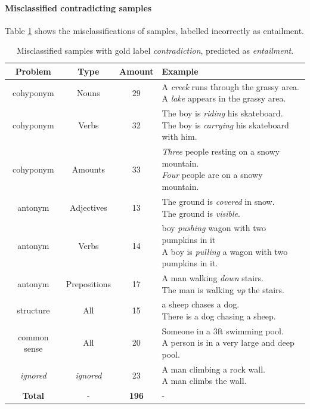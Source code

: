 \paragraph*{Misclassified contradicting samples}
Table \ref{tab:misclassified_orig_contr} shows the misclassifications of samples, labelled incorrectly as entailment.
\begin{table}[tph!]
\centering
\begin{tabular}{cccl}
\textbf{Problem} & \textbf{Type} & \textbf{Amount} & \textbf{Example} \\
\toprule
cohyponym & Nouns & 29 & \specialcell{A \textit{creek} runs through the grassy area.\\A \textit{lake} appears in the grassy area.}\\
cohyponym & Verbs & 32 & \specialcell{The boy is \textit{riding} his skateboard.\\The boy is \textit{carrying} his skateboard with him.}\\
cohyponym & Amounts & 33 & \specialcell{\textit{Three} people resting on a snowy mountain.\\\textit{Four} people are on a snowy mountain.}\\
antonym & Adjectives & 13 & \specialcell{The ground is \textit{covered} in snow.\\The ground is \textit{visible}.}\\
antonym & Verbs & 14 & \specialcell{boy \textit{pushing} wagon with two pumpkins in it\\A boy is \textit{pulling} a wagon with two pumpkins in it.}\\
antonym & Prepositions & 17 & \specialcell{A man walking \textit{down} stairs.\\The man is walking \textit{up} the stairs.}\\
\midrule
structure & All & 15 & \specialcell{a sheep chases a dog.\\There is a dog chasing a sheep.}\\
common sense & All & 20 & \specialcell{Someone in a 3ft swimming pool.\\A person is in a very large and deep pool.}\\
\midrule
\textit{ignored} & \textit{ignored} & 23 & \specialcell{A man climbing a rock wall.\\A man climbs the wall.}\\
\midrule
\textbf{Total} & - & \textbf{196} & - \\
\bottomrule      
\end{tabular}
\caption{Misclassified samples with gold label \textit{contradiction}, predicted as \textit{entailment}.}
\label{tab:misclassified_orig_contr}
\end{table}
